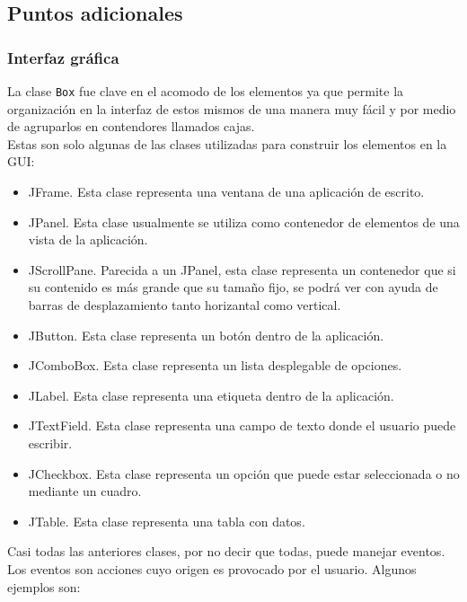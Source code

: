 \subsection*{Puntos adicionales}

\subsubsection*{Interfaz gráfica}
La clase \texttt{Box} fue clave en el acomodo de los elementos ya que permite la organización en la interfaz de estos mismos
de una manera muy fácil y por medio de agruparlos en contendores llamados cajas.\\

Estas son solo algunas de las clases utilizadas para construir los elementos en la GUI:

\begin{itemize}
    \item JFrame. Esta clase representa una ventana de una aplicación de escrito.
    \item JPanel. Esta clase usualmente se utiliza como contenedor de elementos de una vista de la aplicación.
    \item JScrollPane. Parecida a un JPanel, esta clase representa un contenedor que si su contenido es más grande que su tamaño
    fijo, se podrá ver con ayuda de barras de desplazamiento tanto horizantal como vertical.
    \item JButton. Esta clase representa un botón dentro de la aplicación. 
    \item JComboBox. Esta clase representa un lista desplegable de opciones.
    \item JLabel. Esta clase representa una etiqueta dentro de la aplicación.
    \item JTextField. Esta clase representa una campo de texto donde el usuario puede escribir.
    \item JCheckbox. Esta clase representa un opción que puede estar seleccionada o no mediante un cuadro.
    \item JTable. Esta clase representa una tabla con datos.
  \end{itemize}

  Casi todas las anteriores clases, por no decir que todas, puede manejar eventos. Los eventos son acciones cuyo origen es provocado
  por el usuario. Algunos ejemplos son:

